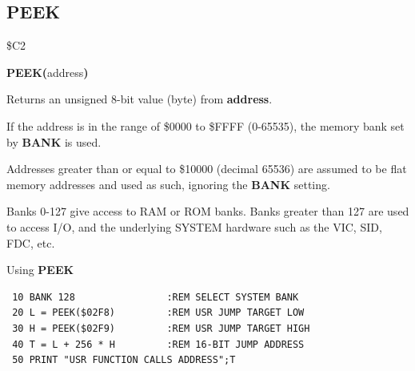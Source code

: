 
\newpage
\subsection{PEEK}
\begin{description}[leftmargin=2cm,style=nextline]
\item [Token:] \$C2
\item [Format:] {\bf PEEK(}address{\bf)}
\item [Usage:]  Returns an unsigned 8-bit value (byte)
                from {\bf address}.

                If the address is in the range of \$0000 to \$FFFF (0-65535), the
                memory bank set by {\bf BANK} is used.

                Addresses greater than or equal to \$10000 (decimal 65536) are assumed to be flat memory
                addresses and used as such, ignoring the {\bf BANK} setting.

\item [Remarks:] Banks 0-127 give access to RAM or ROM banks.
                 Banks greater than 127 are used to access I/O, and the underlying SYSTEM hardware such as the
                 VIC, SID, FDC, etc.
\item [Example:] Using {\bf PEEK}

\begin{tcolorbox}[colback=black,coltext=white]
\verbatimfont{\codefont}
\begin{verbatim}
 10 BANK 128                :REM SELECT SYSTEM BANK
 20 L = PEEK($02F8)         :REM USR JUMP TARGET LOW
 30 H = PEEK($02F9)         :REM USR JUMP TARGET HIGH
 40 T = L + 256 * H         :REM 16-BIT JUMP ADDRESS
 50 PRINT "USR FUNCTION CALLS ADDRESS";T
\end{verbatim}
\end{tcolorbox}
\end{description}


\newpage
